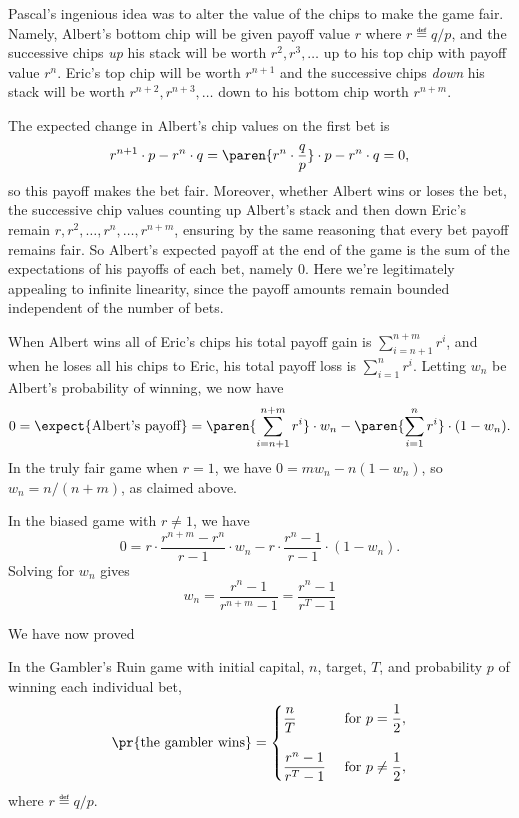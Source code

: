 Pascal's ingenious idea was to alter the value of the chips to make
the game fair.  Namely, Albert's bottom chip will be given payoff
value $r$ where $r \eqdef q/p$, and the successive chips \emph{up} his
stack will be worth $r^{2},r^{3},\dots$ up to his top chip with payoff
value $r^n$.  Eric's top chip will be worth $r^{n+1}$ and the
successive chips \emph{down} his stack will be worth
$r^{n+2},r^{n+3},\dots$ down to his bottom chip worth $r^{n+m}$.

The expected change in Albert's chip values on the first bet is
\[
r^{n+1}\cdot p - r^n\cdot q
   = \paren{r^n \cdot \frac{q}{p}} \cdot p - r^n\cdot q = 0,
\]
so this payoff makes the bet fair.  Moreover, whether Albert wins or
loses the bet, the successive chip values counting up Albert's stack
and then down Eric's remain $r,r^2,\dots,r^n,\dots,r^{n+m}$, ensuring
by the same reasoning that every bet payoff remains fair.  So Albert's
expected payoff at the end of the game is the sum of the expectations
of his payoffs of each bet, namely 0.  Here we're legitimately
appealing to infinite linearity, since the payoff amounts remain
bounded independent of the number of bets.

When Albert wins all of Eric's chips his total payoff gain is
$\sum_{i=n+1}^{n+m} r^i$, and when he loses all his chips to Eric, his
total payoff loss is $\sum_{i=1}^n r^i$.  Letting $w_n$ be Albert's
probability of winning, we now have
\[
0 = \expect{\text{Albert's payoff}} = \paren{\sum_{i=n+1}^{n+m}
  r^i}\cdot w_n  - \paren{\sum_{i=1}^n r^i} \cdot (1-w_n).
\]
In the truly fair game when $r=1$, we have $0 = mw_n - n(1-w_n)$, so
$w_n = n/(n+m)$, as claimed above.

In the biased game with $r\neq 1$, we have
\[
0 =   r \cdot \frac{r^{n+m} - r^{n}}{r-1} \cdot w_n
        - r \cdot \frac{r^{n}-1}{r-1}\cdot (1-w_n).
\]
Solving for $w_n$ gives
\begin{equation}\label{LN12:wnsol}
w_n = \frac{r^n-1}{r^{n+m} -1} = \frac{r^n-1}{r^{T} -1}
\end{equation}

We have now proved
\begin{theorem}\label{thm:gamblerruin}
  In the Gambler's Ruin game with initial capital, $n$, target, $T$,
  and probability $p$ of winning each individual bet,
\begin{equation}\label{eq:gamblerruin}
\pr{\text{the gambler wins}} =
\begin{cases}
 \dfrac{n}{T} & \text{ for } p = \dfrac{1}{2},\\
              &   \\
 \dfrac{r^n-1}{r^{T} -1} & \text{ for } p \neq \dfrac{1}{2},
\end{cases}
\end{equation}
where $r \eqdef q/p$.
\end{theorem}

